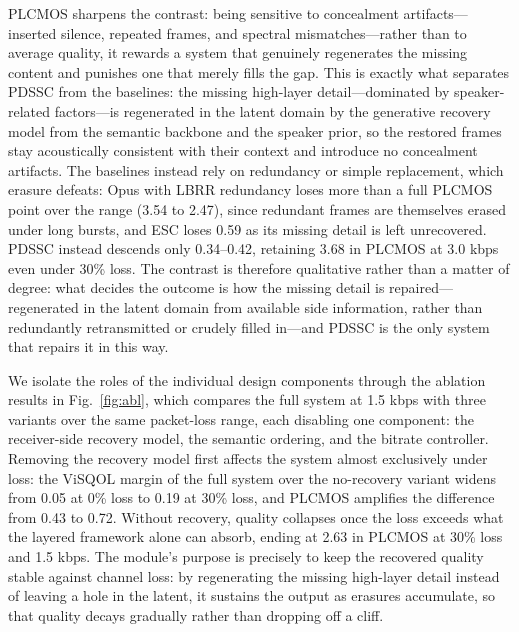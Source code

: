 \documentclass[lettersize,journal]{IEEEtran}
\makeatletter
\renewcommand{\subsection}{\@startsection{subsection}{2}{\z@}{2.0ex plus 1ex minus 0.5ex}{0.7ex plus .5ex minus 0ex}{\normalfont\normalsize\itshape}}
\makeatother
\begin{document}
PLCMOS sharpens the contrast: being sensitive to concealment artifacts---inserted silence, repeated frames, and spectral mismatches---rather than to average quality, it rewards a system that genuinely regenerates the missing content and punishes one that merely fills the gap. This is exactly what separates PDSSC from the baselines: the missing high-layer detail---dominated by speaker-related factors---is regenerated in the latent domain by the generative recovery model from the semantic backbone and the speaker prior, so the restored frames stay acoustically consistent with their context and introduce no concealment artifacts. The baselines instead rely on redundancy or simple replacement, which erasure defeats: Opus with LBRR redundancy loses more than a full PLCMOS point over the range (3.54 to 2.47), since redundant frames are themselves erased under long bursts, and ESC loses 0.59 as its missing detail is left unrecovered. PDSSC instead descends only 0.34--0.42, retaining 3.68 in PLCMOS at 3.0 kbps even under 30\% loss. The contrast is therefore qualitative rather than a matter of degree: what decides the outcome is how the missing detail is repaired---regenerated in the latent domain from available side information, rather than redundantly retransmitted or crudely filled in---and PDSSC is the only system that repairs it in this way.

\subsection{Ablation Study}

We isolate the roles of the individual design components through the ablation results in Fig.~\ref{fig:abl}, which compares the full system at 1.5 kbps with three variants over the same packet-loss range, each disabling one component: the receiver-side recovery model, the semantic ordering, and the bitrate controller. Removing the recovery model first affects the system almost exclusively under loss: the ViSQOL margin of the full system over the no-recovery variant widens from 0.05 at 0\% loss to 0.19 at 30\% loss, and PLCMOS amplifies the difference from 0.43 to 0.72. Without recovery, quality collapses once the loss exceeds what the layered framework alone can absorb, ending at 2.63 in PLCMOS at 30\% loss and 1.5 kbps. The module's purpose is precisely to keep the recovered quality stable against channel loss: by regenerating the missing high-layer detail instead of leaving a hole in the latent, it sustains the output as erasures accumulate, so that quality decays gradually rather than dropping off a cliff.
\end{document}
